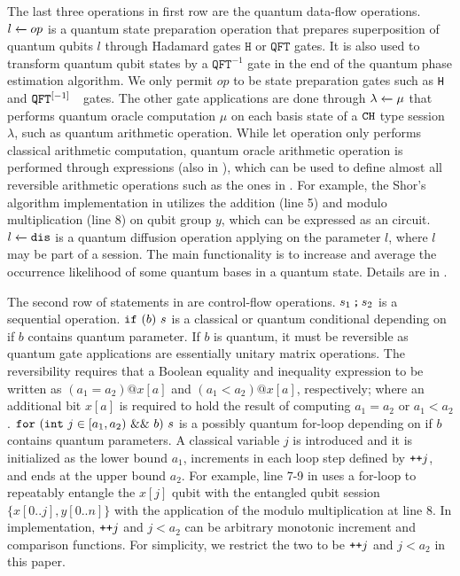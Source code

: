 The last three operations in first row are the quantum data-flow operations.
$\ssassign{l}{}{op}$ is a quantum state preparation operation that prepares superposition of quantum qubits $l$ through Hadamard gates $\texttt{H}$ or $\texttt{QFT}$ gates. It is also used to transform quantum qubit states by a $\texttt{QFT}^{-1}$ gate in the end of the quantum phase estimation algorithm. 
We only permit $op$ to be state preparation gates such as \texttt{H} and $\iqft[\lbrack -1 \rbrack]{}{}$ gates.
The other gate applications are done through $\ssassign{\lambda}{}{\mu}$ that performs quantum oracle computation $\mu$ on each basis state of a $\tcht$ type session $\lambda$, such as quantum arithmetic operation. While let operation only performs classical arithmetic computation, quantum oracle arithmetic operation is performed through \oqasm expressions \cite{oracleoopsla} (also in ), which can be used to define almost all reversible arithmetic operations such as the ones in . 
For example, the Shor's algorithm implementation in  utilizes the addition (line 5) and modulo multiplication (line 8) on qubit group $y$, which can be expressed as an \oqasm circuit.
$\ssassign{l}{}{\sdis}$ is a quantum diffusion operation applying on the parameter $l$, where $l$ may be part of a session.
The main functionality is to increase and average the occurrence likelihood of some quantum bases in a quantum state. Details are in .

The second row of statements in  are control-flow operations.
$\sseq{s_1}{s_2}$ is a sequential operation.
$\sifq{b}{s}$ is a classical or quantum conditional depending on if $b$ contains quantum parameter.
If $b$ is quantum, it must be reversible as quantum gate applications are essentially unitary matrix operations.
The reversibility requires that a Boolean equality and inequality expression to be written as $(a_1 = a_2) @ x[a]$ and $(a_1 < a_2) @ x[a]$, respectively; where an additional bit $x[a]$ is required to hold the result of computing $a_1=a_2$ or $a_1<a_2$.
$\sqwhile{j}{a_1}{a_2}{b}{s}$ is a possibly quantum for-loop depending on if $b$ contains quantum parameters.
A classical variable $j$ is introduced and it is initialized as the lower bound $a_1$, increments in each loop step defined by $\dplus{j}$, and ends at the upper bound $a_2$.
For example, line 7-9 in  uses a for-loop to repeatably entangle the $x[j]$ qubit with the entangled qubit session $\{x[0..j],y[0..n]\}$ with the application of the modulo multiplication at line 8.
In \qafny implementation, $\dplus{j}$ and $j<a_2$ can be arbitrary monotonic increment and comparison functions.
For simplicity, we restrict the two to be $\dplus{j}$ and $j<a_2$ in this paper.

